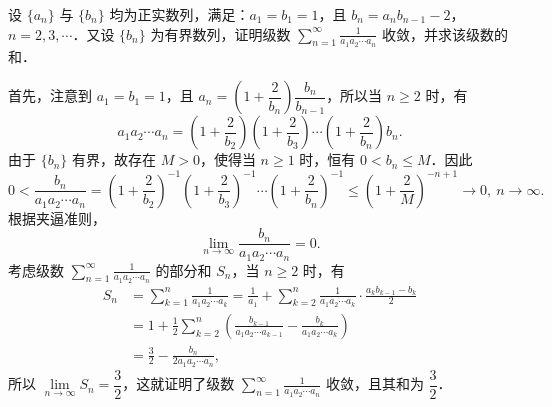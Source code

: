 设 $\{a_{n}\}$ 与 $\{b_{n}\}$ 均为正实数列，满足：$a_{1}=b_{1}=1$，且 $b_{n}=a_{n}b_{n-1}-2$，$n=2,3,\cdots$．又设 $\{b_{n}\}$ 为有界数列，证明级数 $\displaystyle\sum_{n=1}^{\infty}\frac{1}{a_{1}a_{2}\cdots a_{n}}$ 收敛，并求该级数的和．
\begin{solution}
首先，注意到 $a_{1}=b_{1}=1$，且 $a_{n}=\left(1+\dfrac{2}{b_{n}}\right)\dfrac{b_{n}}{b_{n-1}}$，所以当 $n\ge2$ 时，有
\[
a_{1}a_{2}\cdots a_{n}=\left(1+\frac{2}{b_{2}}\right)\left(1+\frac{2}{b_{3}}\right)\cdots\left(1+\frac{2}{b_{n}}\right)b_{n}.
\]
由于 $\{b_{n}\}$ 有界，故存在 $M>0$，使得当 $n\ge1$ 时，恒有 $0<b_{n}\le M$．因此
\[
0<\frac{b_{n}}{a_{1}a_{2}\cdots a_{n}}=\left(1+\frac{2}{b_{2}}\right)^{-1}\left(1+\frac{2}{b_{3}}\right)^{-1}\cdots\left(1+\frac{2}{b_{n}}\right)^{-1}
\le\left(1+\frac{2}{M}\right)^{-n+1}\to0,\ n\to\infty.
\]
根据夹逼准则，
\[
\lim_{n\to\infty}\frac{b_{n}}{a_{1}a_{2}\cdots a_{n}}=0.
\]
考虑级数 $\displaystyle\sum_{n=1}^{\infty}\frac{1}{a_{1}a_{2}\cdots a_{n}}$ 的部分和 $S_{n}$，当 $n\ge2$ 时，有
\begin{align*}
S_{n}&=\sum_{k=1}^{n}\frac{1}{a_{1}a_{2}\cdots a_{k}}
=\frac{1}{a_{1}}+\sum_{k=2}^{n}\frac{1}{a_{1}a_{2}\cdots a_{k}}\cdot\frac{a_{k}b_{k-1}-b_{k}}{2}\\
&=1+\frac{1}{2}\sum_{k=2}^{n}\left(\frac{b_{k-1}}{a_{1}a_{2}\cdots a_{k-1}}-\frac{b_{k}}{a_{1}a_{2}\cdots a_{k}}\right)\\
&=\frac{3}{2}-\frac{b_{n}}{2a_{1}a_{2}\cdots a_{n}},
\end{align*}
所以 $\lim\limits_{n\to\infty}S_{n}=\dfrac{3}{2}$，这就证明了级数 $\displaystyle\sum_{n=1}^{\infty}\frac{1}{a_{1}a_{2}\cdots a_{n}}$ 收敛，且其和为 $\dfrac{3}{2}$．
\end{solution}

